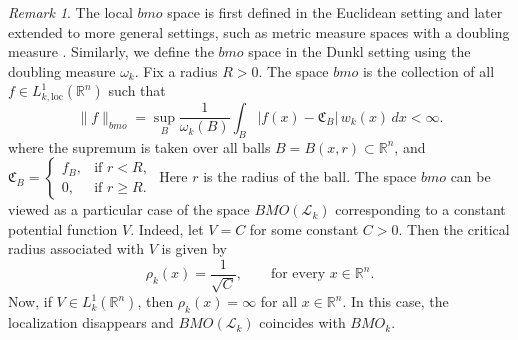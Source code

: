 \documentclass[11pt, reqno]{amsproc}
\theoremstyle{definition}
\theoremstyle{remark}
\newtheorem{remark}[theorem]{Remark}
\numberwithin{equation}{section}
\begin{document}
\begin{remark}
The local $bmo$ space is first defined in the Euclidean setting \cite{Goldberg} and later extended to more general settings, such as metric measure spaces with a doubling measure \cite{Dafni-2012}. Similarly, we define the $bmo$ space in the Dunkl setting using the doubling measure $\omega_k$. Fix a radius $R > 0$. The space $bmo$ is the collection of all $f\in L_{k,\text{loc}}^1(\mathbb{R}^n)$ such that
\[
\|f\|_{bmo} = \sup_{B}
\frac{1}{\omega_k(B)}
\int_B |f(x) - \mathfrak{C}_B|\, w_k(x)\, dx
< \infty. 
\]
where the supremum is taken over all balls $B=B(x,r) \subset\mathbb{R}^n$, and
$
\mathfrak{C}_B =
\begin{cases}
f_B, & \text{if } r < R, \\
0,   & \text{if } r \ge R.
\end{cases}$
Here $r$ is the radius of the ball. The space $bmo$ can be viewed as a particular case of the space $BMO(\mathcal{L}_k)$
corresponding to a constant potential function $V$. Indeed, let $V=C$ 
for some constant $C>0$. Then the critical radius associated with $V$ is
given by 
\[
\rho_k(x)=\frac{1}{\sqrt{C}}, \qquad \text{for every } x\in\mathbb{R}^n.
\]
Now, if $V\in L_k^1(\mathbb{R}^n)$, then $\rho_k(x)=\infty$ for all
$x\in\mathbb{R}^n$. In this case, the localization disappears and
$BMO(\mathcal{L}_k)$ coincides with $BMO_k$.
\end{remark}
\end{document}

